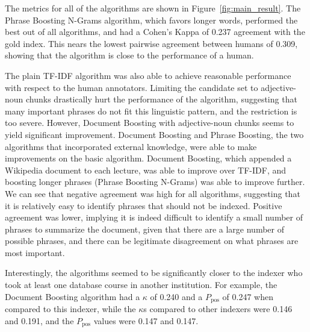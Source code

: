 The metrics for all of the algorithms are shown in
Figure~\ref{fig:main_result}. The Phrase Boosting N-Grams algorithm,
which favors longer words, performed the best out of all algorithms,
and had a Cohen's Kappa of 0.237 agreement with the gold index. This nears the
lowest pairwise agreement between humans of 0.309, showing that the
algorithm is close to the performance of a human.

The plain TF-IDF algorithm was also able to achieve reasonable
performance with respect to the human annotators. Limiting the
candidate set to adjective-noun chunks drastically hurt the
performance of the algorithm, suggesting that many important phrases
do not fit this linguistic pattern, and the restriction is too
severe. However, Document Boosting with adjective-noun chunks seems to
yield significant improvement. Document Boosting and Phrase Boosting, the two algorithms that
incorporated external knowledge, were able to make improvements on the
basic algorithm. Document Boosting, which appended a Wikipedia document to
each lecture, was able to improve over TF-IDF, and boosting
longer phrases (Phrase Boosting N-Grams) was able to improve
further. We can see that negative agreement was high for all
algorithms, suggesting that it is relatively easy to identify phrases
that should not be indexed. Positive agreement was lower, implying it is indeed difficult to identify a small number of phrases to summarize the document, given that there are a large number of possible phrases, and there can be legitimate disagreement on what phrases are most important.

Interestingly, the algorithms seemed to be significantly closer to the
indexer who took at least one database course in another institution.
For example, the Document Boosting algorithm had a $\kappa$ of 0.240 and
a $P_{\text{pos}}$ of 0.247 when compared to this indexer, while the
$\kappa$s compared to other indexers were 0.146 and 0.191, and the
$P_{\text{pos}}$ values were 0.147 and 0.147.


